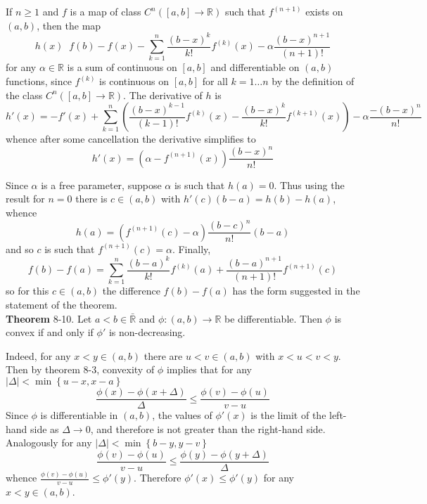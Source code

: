 \documentclass[a4paper]{article}
\newcommand{\obj}[1]{\left\{ #1 \right \}}
\newcommand{\clo}[1]{\left [ #1 \right ]}
\newcommand{\brac}[1]{\left ( #1 \right )}
\newcommand{\abs}[1]{\left | #1 \right |}
\newcommand{\Rbar}{{\bar{\mathbb{R}}}}
\newcommand{\Real}{\mathbb{R}}
\newcommand{\defn}{\mathop{\overset{\Delta}{=}}\nolimits}
\begin{document}
If $n\geq 1$ and $f$ is a map of class $C^n\brac{\clo{a,b}\to\Real}$ such that $f^{\brac{n+1}}$ exists on $\brac{a,b}$, then the map \[h\brac{x}\defn f\brac{b} - f\brac{x} - \sum_{k=1}^n \frac{\brac{b-x}^k}{k!} f^{\brac{k}}\brac{x} - \alpha \frac{\brac{b-x}^{n+1}}{\brac{n+1}!} \] for any $\alpha\in \Real$ is a sum of continuous on $\clo{a,b}$ and differentiable on $\brac{a,b}$ functions, since $f^{\brac{k}}$ is continuous on $\clo{a,b}$ for all $k=1\ldots n$ by the definition of the class $C^n\brac{\clo{a,b}\to\Real}$. The derivative of $h$ is \[h'\brac{x} = -f'\brac{x} + \sum_{k=1}^n \brac{\frac{\brac{b-x}^{k-1}}{\brac{k-1}!} f^{\brac{k}}\brac{x} - \frac{\brac{b-x}^k}{k!} f^{\brac{k+1}}\brac{x}} - \alpha \frac{-\brac{b-x}^n}{n!} \] whence after some cancellation the derivative simplifies to \[h'\brac{x} = \brac{ \alpha - f^{\brac{n+1}}\brac{x} } \frac{\brac{b-x}^n}{n!} \]

Since $\alpha$ is a free parameter, suppose $\alpha$ is such that $h\brac{a}=0$. Thus using the result for $n=0$ there is $c\in \brac{a,b}$ with $h'\brac{c}\brac{b-a}=h\brac{b}-h\brac{a}$, whence \[h\brac{a} = \brac{ f^{\brac{n+1}}\brac{c} - \alpha } \frac{\brac{b-c}^n}{n!}\brac{b-a}\] and so $c$ is such that $f^{\brac{n+1}}\brac{c} = \alpha$. Finally, \[ f\brac{b} - f\brac{a} = \sum_{k=1}^n \frac{\brac{b-a}^k}{k!} f^{\brac{k}}\brac{a} + \frac{\brac{b-a}^{n+1}}{\brac{n+1}!} f^{\brac{n+1}}\brac{c} \] so for this $c\in \brac{a,b}$ the difference $f\brac{b}-f\brac{a}$ has the form suggested in the statement of the theorem.\\

\label{thm:convex_deriv} \noindent \textbf{Theorem} 8-10.
Let $a<b\in \Rbar$ and $\phi:\brac{a,b}\to\Real$ be differentiable. Then $\phi$ is convex if and only if $\phi'$ is non-decreasing.

Indeed, for any $x<y \in \brac{a,b}$ there are $u<v \in \brac{a,b}$ with $x < u < v < y$. Then by theorem 8-3, convexity of $\phi$ implies that for any $\abs{\Delta}<\min\obj{u-x,x-a}$ \[\frac{\phi\brac{x}-\phi\brac{x+\Delta}}{\Delta} \leq \frac{\phi\brac{v}-\phi\brac{u}}{v-u}\] Since $\phi$ is differentiable in $\brac{a,b}$, the values of $\phi'\brac{x}$ is the limit of the left-hand side as $\Delta\to 0$, and therefore is not greater than the right-hand side. Analogously for any $\abs{\Delta}<\min\obj{b-y,y-v}$ \[\frac{\phi\brac{v}-\phi\brac{u}}{v-u}\leq \frac{\phi\brac{y}-\phi\brac{y+\Delta}}{\Delta}\] whence $\frac{\phi\brac{v}-\phi\brac{u}}{v-u} \leq \phi'\brac{y}$. Therefore $\phi'\brac{x}\leq \phi'\brac{y}$ for any $x<y\in \brac{a,b}$.
\end{document}
